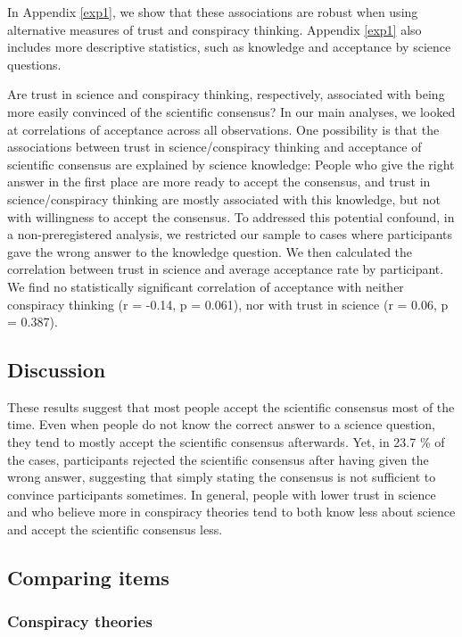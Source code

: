 \documentclass[
  doc,floatsintext]{apa6}
\begin{document}
In Appendix \ref{exp1}, we show that these associations are robust when using alternative measures of trust and conspiracy thinking. Appendix \ref{exp1} also includes more descriptive statistics, such as knowledge and acceptance by science questions.

Are trust in science and conspiracy thinking, respectively, associated with being more easily convinced of the scientific consensus? In our main analyses, we looked at correlations of acceptance across all observations. One possibility is that the associations between trust in science/conspiracy thinking and acceptance of scientific consensus are explained by science knowledge: People who give the right answer in the first place are more ready to accept the consensus, and trust in science/conspiracy thinking are mostly associated with this knowledge, but not with willingness to accept the consensus. To addressed this potential confound, in a non-preregistered analysis, we restricted our sample to cases where participants gave the wrong answer to the knowledge question. We then calculated the correlation between trust in science and average acceptance rate by participant. We find no statistically significant correlation of acceptance with neither conspiracy thinking (r = -0.14, p = 0.061), nor with trust in science (r = 0.06, p = 0.387).

\subsection{Discussion}\label{discussion-1}

These results suggest that most people accept the scientific consensus most of the time. Even when people do not know the correct answer to a science question, they tend to mostly accept the scientific consensus afterwards. Yet, in 23.7 \% of the cases, participants rejected the scientific consensus after having given the wrong answer, suggesting that simply stating the consensus is not sufficient to convince participants sometimes. In general, people with lower trust in science and who believe more in conspiracy theories tend to both know less about science and accept the scientific consensus less.

\subsection{Comparing items}\label{comparing-items}

\subsubsection{Conspiracy theories}\label{conspiracy-theories}
\end{document}
